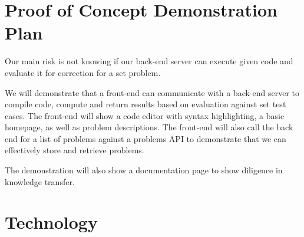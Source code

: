 \documentclass{article}
\begin{document}
\section{Proof of Concept Demonstration Plan}






Our main risk is not knowing if our back-end server can execute given code and evaluate it for correction for a set problem.

We will demonstrate that a front-end can communicate with a back-end server to compile code, compute and return results based on evaluation against set test cases. The front-end will show a code editor with syntax highlighting, a basic homepage, as well as problem descriptions. The front-end will also call the back end for a list of problems against a problems API to demonstrate that we can effectively store and retrieve problems.

The demonstration will also show a documentation page to show diligence in knowledge transfer.

\section{Technology}
\end{document}
